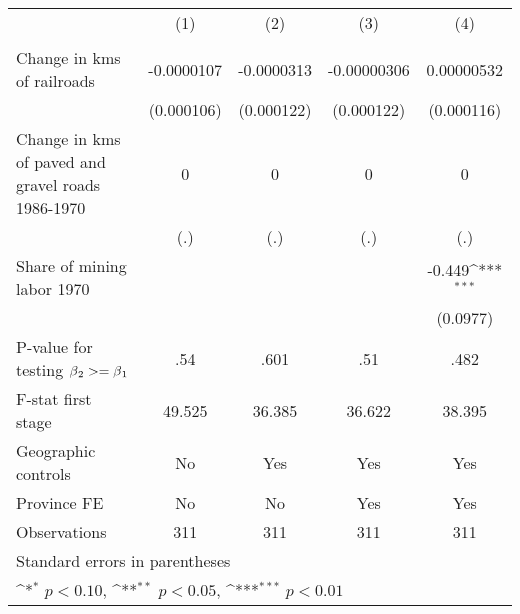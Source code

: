 {
\def\sym#1{\ifmmode^{#1}\else\(^{#1}\)\fi}
\begin{tabular}{l*{4}{c}}
\hline\hline
                &\multicolumn{1}{c}{(1)}&\multicolumn{1}{c}{(2)}&\multicolumn{1}{c}{(3)}&\multicolumn{1}{c}{(4)}\\
                &\multicolumn{1}{c}{}&\multicolumn{1}{c}{}&\multicolumn{1}{c}{}&\multicolumn{1}{c}{}\\
\hline
Change in kms of railroads&-0.0000107         &-0.0000313         &-0.00000306         &0.00000532         \\
                &(0.000106)         &(0.000122)         &(0.000122)         &(0.000116)         \\
[1em]
Change in kms of paved and gravel roads 1986-1970&        0         &        0         &        0         &        0         \\
                &      (.)         &      (.)         &      (.)         &      (.)         \\
[1em]
Share of mining labor 1970&                  &                  &                  &   -0.449\sym{***}\\
                &                  &                  &                  & (0.0977)         \\
\hline
P-value for testing $\beta\\_2 >= \beta\\_1$&      .54         &     .601         &      .51         &     .482         \\
F-stat first stage&   49.525         &   36.385         &   36.622         &   38.395         \\
Geographic controls&       No         &      Yes         &      Yes         &      Yes         \\
Province FE     &       No         &       No         &      Yes         &      Yes         \\
Observations    &      311         &      311         &      311         &      311         \\
\hline\hline
\multicolumn{5}{l}{\footnotesize Standard errors in parentheses}\\
\multicolumn{5}{l}{\footnotesize \sym{*} \(p<0.10\), \sym{**} \(p<0.05\), \sym{***} \(p<0.01\)}\\
\end{tabular}
}
